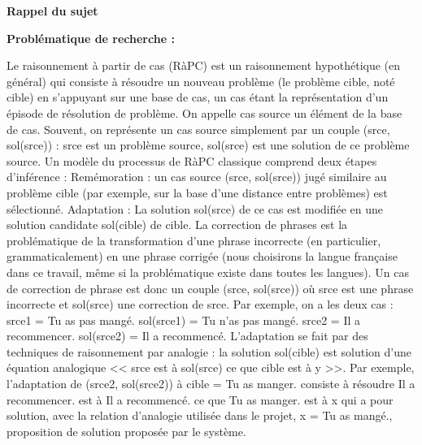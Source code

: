 \documentclass[11pt]{article}
\begin{document}
\cleardoublepage

\thispagestyle{empty}

\begin{center}
{\bfseries \huge Rappel du sujet}
\end{center}

\vspace*{10mm}


{\bfseries Probl\'ematique de recherche : }
\newline
\vspace*{2mm}

Le raisonnement \`{a} partir de cas (R\`{a}PC) est un raisonnement hypoth\'etique (en g\'en\'eral) qui consiste \`{a} r\'esoudre un nouveau probl\`{e}me (le probl\`{e}me cible, not\'e cible) en s'appuyant sur une base de cas, un cas \'etant la repr\'esentation d'un \'episode de r\'esolution de probl\`{e}me. On appelle cas source un \'el\'ement de la base de cas. Souvent, on repr\'esente un cas source simplement par un couple (srce, sol(srce)) : srce est un probl\`{e}me source, sol(srce) est une solution de ce probl\`{e}me source. Un mod\`{e}le du processus de R\`{a}PC classique comprend deux \'etapes d'inf\'erence : 
\newline
Rem\'emoration : un cas source (srce, sol(srce)) jug\'e similaire au probl\`{e}me cible (par exemple, sur la base d'une distance entre probl\`{e}mes) est s\'electionn\'e. 
\newline
Adaptation : La solution sol(srce) de ce cas est modifi\'ee en une solution candidate sol(cible) de cible. 
\newline
La correction de phrases est la probl\'ematique de la transformation d'une phrase incorrecte (en particulier, grammaticalement) en une phrase corrig\'ee (nous choisirons la langue fran\c{c}aise dans ce travail, m\^eme si la probl\'ematique existe dans toutes les langues). Un cas de correction de phrase est donc un couple (srce, sol(srce)) o\`{u} srce est une phrase incorrecte et sol(srce) une correction de srce. Par exemple, on a les deux cas : 
\newline
srce1 = Tu as pas mang\'e. sol(srce1) = Tu n'as pas mang\'e. 
\newline
srce2 = Il a recommencer. sol(srce2) = Il a recommenc\'e. 
\newline
L'adaptation se fait par des techniques de raisonnement par analogie : la solution sol(cible) est solution d'une \'equation analogique << srce est \`{a} sol(srce) ce que cible est \`{a} y >>. Par exemple, l'adaptation de (srce2, sol(srce2)) \`{a} cible = Tu as manger. consiste \`{a} r\'esoudre Il a recommencer. est \`{a} Il a recommenc\'e. ce que Tu as manger. est \`{a} x qui a pour solution, avec la relation d'analogie utilis\'ee dans le projet, x = Tu as mang\'e., proposition de solution propos\'ee par le syst\`{e}me. 
\end{document}

